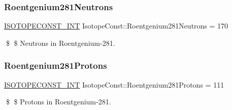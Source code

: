 \subsubsection{\texorpdfstring{Roentgenium281\+Neutrons}{Roentgenium281Neutrons}}
{\footnotesize\ttfamily \mbox{\hyperlink{group___isotope_const-_macros_ga5f18360b3e99483a35c32d789e62621c}{I\+S\+O\+T\+O\+P\+E\+C\+O\+N\+S\+T\+\_\+\+I\+NT}} Isotope\+Const\+::\+Roentgenium281\+Neutrons = 170}

\$ \$ Neutrons in Roentgenium-\/281. \mbox{\label{group___isotope_const-_roentgenium-_rg281_ga12a3bd3e28bcadad8184509ee4373008}} 
\subsubsection{\texorpdfstring{Roentgenium281\+Protons}{Roentgenium281Protons}}
{\footnotesize\ttfamily \mbox{\hyperlink{group___isotope_const-_macros_ga5f18360b3e99483a35c32d789e62621c}{I\+S\+O\+T\+O\+P\+E\+C\+O\+N\+S\+T\+\_\+\+I\+NT}} Isotope\+Const\+::\+Roentgenium281\+Protons = 111}

\$ \$ Protons in Roentgenium-\/281. 